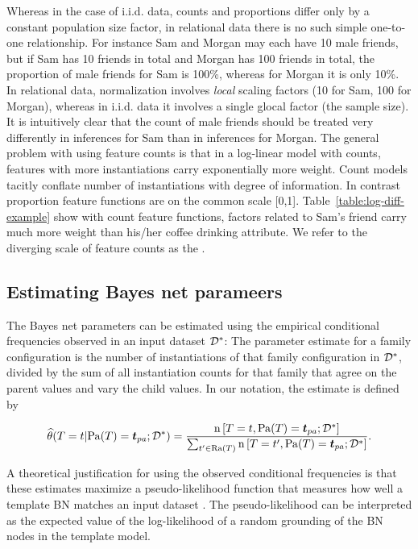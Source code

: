 \documentclass[runningheads,a4paper]{llncs}
\newcommand{\iid}{i.i.d.}
\begin{document}
Whereas in the case of \iid{} data, counts and proportions differ only by a constant population size factor, in relational data there is no such simple one-to-one relationship. For instance Sam and Morgan may each have 10 male friends, but if Sam has 10 friends in total and Morgan has 100 friends in total, the proportion of male friends for Sam is 100\%, whereas for Morgan it is only 10\%. In relational data, normalization involves {\em local} scaling factors (10 for Sam, 100 for Morgan), whereas in i.i.d. data it involves a single glocal factor (the sample size). It is intuitively clear that the count of male friends should be treated very differently in inferences for Sam than in inferences for Morgan. The general problem with using feature counts is that in a log-linear model with counts, features with more instantiations carry exponentially more weight. Count models tacitly conflate number of instantiations with degree of information.
In contrast proportion feature functions are on the common scale [0,1]. Table~\ref{table:log-diff-example} show with count feature functions, factors related to Sam's friend carry much more weight than his/her coffee drinking attribute. 
%
We refer to the diverging scale of feature counts as the . 

\subsection{Estimating Bayes net parameers}

The Bayes net parameters can be estimated using the empirical conditional frequencies observed in an input dataset $\mathcal{D}^{*}\hspace{0.0ex}$: The parameter estimate for a family configuration is the number of instantiations of that family configuration in $\mathcal{D}^{*}\hspace{0.0ex}$, divided by the sum of all instantiation counts for that family that agree on the parent values and vary the child values. In our notation, the estimate is defined by

\newcommand{\CTPa}{\Count{\Appendterm{\TT = \TV} {\Pa{\TT} = \Prange{\TT}}}  {\FG{\D}}}
\newcommand{\CTPb}{\Count{\Appendterm{\TT = \TV'} {\Pa{\TT} = \Prange{\TT}}}  {\FG{\D}}}

\begin{equation} \label{eq:frequencies}
\estcprob{\TT = \TV} {\Pa{\TT} = \Prange{\TT}} {\FG{\D}} = 
    \frac{\CTPa}
           {\sum_{\TV' \in \Range{\TT}}\CTPb}.
\end{equation}

A theoretical justification for using the observed conditional frequencies is that these estimates maximize a pseudo-likelihood function that measures how well a template BN matches an input dataset \cite{Schulte2011,Schulte2013}. The pseudo-likelihood can be interpreted as the expected value of the log-likelihood of a random grounding of the BN nodes in the template model.
\end{document}
